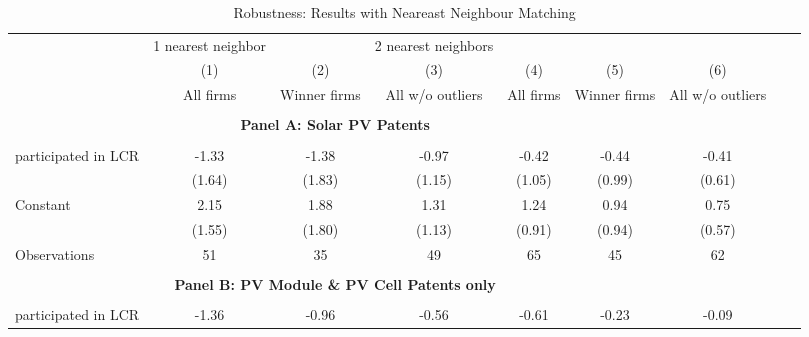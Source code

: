 \begin{table}[htbp]\centering \\  \def\sym#1{\ifmmode^{#1}\else\(^{#1}\)\fi} \\ \caption{Robustness: Results with Neareast Neighbour Matching} \\ \begin{tabular}{l*{8}{c}} \hline\hline
                    &1 nearest neighbor         &                     &2 nearest neighbors         &                     &                     &                     \\
                    &\multicolumn{1}{c}{(1)}&\multicolumn{1}{c}{(2)}&\multicolumn{1}{c}{(3)}&\multicolumn{1}{c}{(4)}&\multicolumn{1}{c}{(5)}&\multicolumn{1}{c}{(6)}\\
                    &\multicolumn{1}{c}{All firms}&\multicolumn{1}{c}{Winner firms}&\multicolumn{1}{c}{All w/o outliers}&\multicolumn{1}{c}{All firms}&\multicolumn{1}{c}{Winner firms}&\multicolumn{1}{c}{All w/o outliers}\\
\hline \\ \multicolumn{6}{c}{\textbf{Panel A: Solar PV Patents}} \\\\[-1ex]
participated in LCR &       -1.33         &       -1.38         &       -0.97         &       -0.42         &       -0.44         &       -0.41         \\
                    &      (1.64)         &      (1.83)         &      (1.15)         &      (1.05)         &      (0.99)         &      (0.61)         \\
[1em]
Constant            &        2.15         &        1.88         &        1.31         &        1.24         &        0.94         &        0.75         \\
                    &      (1.55)         &      (1.80)         &      (1.13)         &      (0.91)         &      (0.94)         &      (0.57)         \\
\hline
Observations        &          51         &          35         &          49         &          65         &          45         &          62         \\
\hline \\ \multicolumn{6}{c}{\textbf{Panel B: PV Module \& PV Cell Patents only}} \\\\[-1ex]
participated in LCR &       -1.36         &       -0.96         &       -0.56         &       -0.61         &       -0.23         &       -0.09         \\

\end{tabular}
\end{table}
